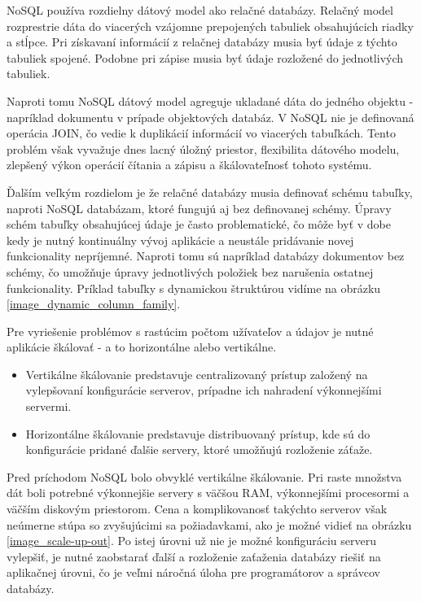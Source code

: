 	NoSQL používa rozdielny dátový model ako relačné databázy. Relačný model rozprestrie dáta do viacerých vzájomne prepojených tabuliek obsahujúcich riadky a stĺpce. Pri získavaní informácií z relačnej databázy musia byť údaje z týchto tabuliek spojené. Podobne pri zápise musia byť údaje rozložené do jednotlivých tabuliek.

	Naproti tomu NoSQL dátový model agreguje ukladané dáta do jedného objektu - napríklad dokumentu v prípade objektových databáz. V NoSQL nie je definovaná operácia JOIN, čo vedie k duplikácií informácií vo viacerých tabuľkách. Tento problém však vyvažuje dnes lacný úložný priestor, flexibilita dátového modelu, zlepšený výkon operácií čítania a zápisu a škálovateľnosť tohoto systému.
	
	Ďalším veľkým rozdielom je že relačné databázy musia definovať schému tabuľky, naproti NoSQL databázam, ktoré fungujú aj bez definovanej schémy. Úpravy schém tabuľky obsahujúcej údaje je často problematické, čo môže byť v dobe kedy je nutný kontinuálny vývoj aplikácie a neustále pridávanie novej funkcionality nepríjemné. Naproti tomu sú napríklad databázy dokumentov bez schémy, čo umožňuje úpravy jednotlivých položiek bez narušenia ostatnej funkcionality. Príklad tabuľky s dynamickou štruktúrou vidíme na obrázku \ref{image_dynamic_column_family}.

	
	Pre vyriešenie problémov s rastúcim počtom užívateľov a údajov je nutné aplikácie škálovať - a to horizontálne alebo vertikálne.
	\begin{itemize}
		\item Vertikálne škálovanie predstavuje centralizovaný prístup založený na vylepšovaní konfigurácie serverov, prípadne ich nahradení výkonnejšími servermi.
		\item Horizontálne škálovanie predstavuje distribuovaný prístup, kde sú do konfigurácie pridané ďalšie servery, ktoré umožňujú rozloženie záťaže.
	\end{itemize}
	Pred príchodom NoSQL bolo obvyklé vertikálne škálovanie. Pri raste množstva dát boli potrebné výkonnejšie servery s väčšou RAM, výkonnejšími procesormi a väčším diskovým priestorom. Cena a komplikovanosť takýchto serverov však neúmerne stúpa so zvyšujúcimi sa požiadavkami, ako je možné vidieť na obrázku \ref{image_scale-up-out}. Po istej úrovni už nie je možné konfiguráciu serveru vylepšiť, je nutné zaobstarať ďalší a rozloženie zaťaženia databázy riešiť na aplikačnej úrovni, čo je veľmi náročná úloha pre programátorov a správcov databázy. 
	
